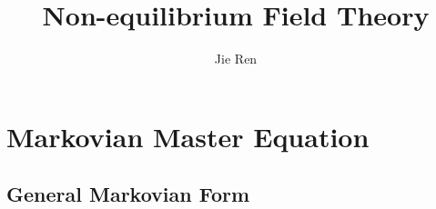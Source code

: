 \documentclass[aps,prb,superscriptaddress,nofootinbib]{revtex4}
\begin{document}
\title{Non-equilibrium Field Theory}
\author{Jie Ren}



\maketitle


\tableofcontents



\section{Markovian Master Equation}

\subsection{General Markovian Form}
\end{document}
